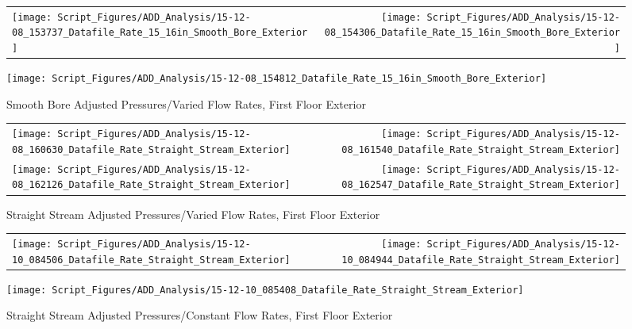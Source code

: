 \documentclass[12pt,oneside]{book}
\begin{document}
\clearpage

\begin{figure}[ht]
\begin{tabular*}{\textwidth}{lr}
\texttt{[image: Script\_Figures/ADD\_Analysis/15-12-08\_153737\_Datafile\_Rate\_15\_16in\_Smooth\_Bore\_Exterior]} &
\texttt{[image: Script\_Figures/ADD\_Analysis/15-12-08\_154306\_Datafile\_Rate\_15\_16in\_Smooth\_Bore\_Exterior]} \\
\end{tabular*}
\centering
\texttt{[image: Script\_Figures/ADD\_Analysis/15-12-08\_154812\_Datafile\_Rate\_15\_16in\_Smooth\_Bore\_Exterior]} \\
\caption{Smooth Bore Adjusted Pressures/Varied Flow Rates, First Floor Exterior}
\label{fig:Smooth Bore Adjusted Pressures/Varied Flow Rates, First Floor Exterior}
\end{figure}

\clearpage

\begin{figure}[ht]
\begin{tabular*}{\textwidth}{lr}
\texttt{[image: Script\_Figures/ADD\_Analysis/15-12-08\_160630\_Datafile\_Rate\_Straight\_Stream\_Exterior]} &
\texttt{[image: Script\_Figures/ADD\_Analysis/15-12-08\_161540\_Datafile\_Rate\_Straight\_Stream\_Exterior]} \\
\texttt{[image: Script\_Figures/ADD\_Analysis/15-12-08\_162126\_Datafile\_Rate\_Straight\_Stream\_Exterior]} &
\texttt{[image: Script\_Figures/ADD\_Analysis/15-12-08\_162547\_Datafile\_Rate\_Straight\_Stream\_Exterior]} \\
\end{tabular*}
\caption{Straight Stream Adjusted Pressures/Varied Flow Rates, First Floor Exterior}
\label{fig:Straight Stream Adjusted Pressures/Varied Flow Rates, First Floor Exterior}
\end{figure}

\clearpage

\begin{figure}[ht]
\begin{tabular*}{\textwidth}{lr}
\texttt{[image: Script\_Figures/ADD\_Analysis/15-12-10\_084506\_Datafile\_Rate\_Straight\_Stream\_Exterior]} &
\texttt{[image: Script\_Figures/ADD\_Analysis/15-12-10\_084944\_Datafile\_Rate\_Straight\_Stream\_Exterior]} \\
\end{tabular*}
\centering
\texttt{[image: Script\_Figures/ADD\_Analysis/15-12-10\_085408\_Datafile\_Rate\_Straight\_Stream\_Exterior]}
\caption{Straight Stream Adjusted Pressures/Constant Flow Rates, First Floor Exterior}
\label{fig:Straight Stream Adjusted Pressures/Constant Flow Rates, First Floor Exterior}
\end{figure}
\end{document}

